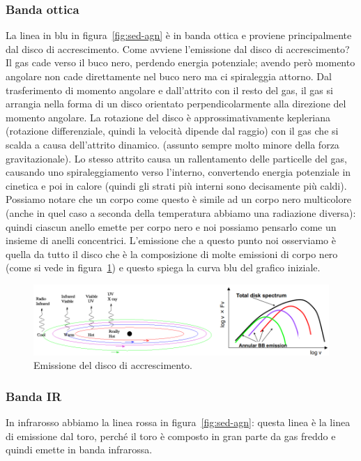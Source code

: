 \subsubsection{Banda ottica}
La linea in blu in figura~\ref{fig:sed-agn} è in banda ottica e proviene principalmente dal disco di accrescimento. Come avviene l'emissione dal disco di accrescimento? Il gas cade verso il buco nero, perdendo energia potenziale; avendo però momento angolare non cade direttamente nel buco nero ma ci spiraleggia attorno. Dal trasferimento di momento angolare e dall'attrito con il resto del gas, il gas si arrangia nella forma di un disco orientato perpendicolarmente alla direzione del momento angolare. La rotazione del disco è approssimativamente kepleriana (rotazione differenziale, quindi la velocità dipende dal raggio) con il gas che si scalda a causa dell'attrito dinamico. (assunto sempre molto minore della forza gravitazionale). Lo stesso attrito causa un rallentamento delle particelle del gas, causando uno spiraleggiamento verso l'interno, convertendo energia potenziale in cinetica e poi in calore (quindi gli strati più interni sono decisamente più caldi). Possiamo notare che un corpo come questo è simile ad un corpo nero multicolore (anche in quel caso a seconda della temperatura abbiamo una radiazione diversa): quindi ciascun anello emette per corpo nero e noi possiamo pensarlo come un insieme di anelli concentrici. L'emissione che a questo punto noi osserviamo è quella da tutto il disco che è la composizione di molte emissioni di corpo nero (come si vede in figura~\ref{fig:emissione-del-disco-di-accrescimento}) e questo spiega la curva blu del grafico iniziale.

\begin{figure}
    \centering
    \includegraphics[width = \textwidth]{immagini/emissione-del-disco-di-accrescimento.png}
    \caption{Emissione del disco di accrescimento.}
    \label{fig:emissione-del-disco-di-accrescimento}
\end{figure}

\subsubsection{Banda IR}
In infrarosso abbiamo la linea rossa in figura~\ref{fig:sed-agn}: questa linea è la linea di emissione dal toro, perché il toro è composto in gran parte da gas freddo e quindi emette in banda infrarossa. 

